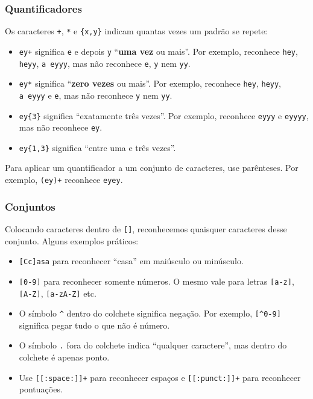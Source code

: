 \documentclass[]{book}
\providecommand{\tightlist}{%
  \setlength{\itemsep}{0pt}\setlength{\parskip}{0pt}}
\begin{document}
\subsubsection{Quantificadores}\label{quantificadores}

Os caracteres \texttt{+}, \texttt{*} e \texttt{\{x,y\}} indicam quantas
vezes um padrão se repete:

\begin{itemize}
\tightlist
\item
  \texttt{ey+} significa \texttt{e} e depois \texttt{y} ``\textbf{uma
  vez} ou mais''. Por exemplo, reconhece \texttt{hey}, \texttt{heyy},
  \texttt{a\ eyyy}, mas não reconhece \texttt{e}, \texttt{y} nem
  \texttt{yy}.
\item
  \texttt{ey*} significa ``\textbf{zero vezes} ou mais''. Por exemplo,
  reconhece \texttt{hey}, \texttt{heyy}, \texttt{a\ eyyy} e \texttt{e},
  mas não reconhece \texttt{y} nem \texttt{yy}.
\item
  \texttt{ey\{3\}} significa ``exatamente três vezes''. Por exemplo,
  reconhece \texttt{eyyy} e \texttt{eyyyy}, mas não reconhece
  \texttt{ey}.
\item
  \texttt{ey\{1,3\}} significa ``entre uma e três vezes''.
\end{itemize}

Para aplicar um quantificador a um conjunto de caracteres, use
parênteses. Por exemplo, \texttt{(ey)+} reconhece \texttt{eyey}.

\subsubsection{Conjuntos}\label{conjuntos}

Colocando caracteres dentro de \texttt{{[}{]}}, reconhecemos quaisquer
caracteres desse conjunto. Alguns exemplos práticos:

\begin{itemize}
\tightlist
\item
  \texttt{{[}Cc{]}asa} para reconhecer ``casa'' em maiúsculo ou
  minúsculo.
\item
  \texttt{{[}0-9{]}} para reconhecer somente números. O mesmo vale para
  letras \texttt{{[}a-z{]}}, \texttt{{[}A-Z{]}}, \texttt{{[}a-zA-Z{]}}
  etc.
\item
  O símbolo \texttt{\^{}} dentro do colchete significa negação. Por
  exemplo, \texttt{{[}\^{}0-9{]}} significa pegar tudo o que não é
  número.
\item
  O símbolo \texttt{.} fora do colchete indica ``qualquer caractere'',
  mas dentro do colchete é apenas ponto.
\item
  Use \texttt{{[}{[}:space:{]}{]}+} para reconhecer espaços e
  \texttt{{[}{[}:punct:{]}{]}+} para reconhecer pontuações.
\end{itemize}
\end{document}
